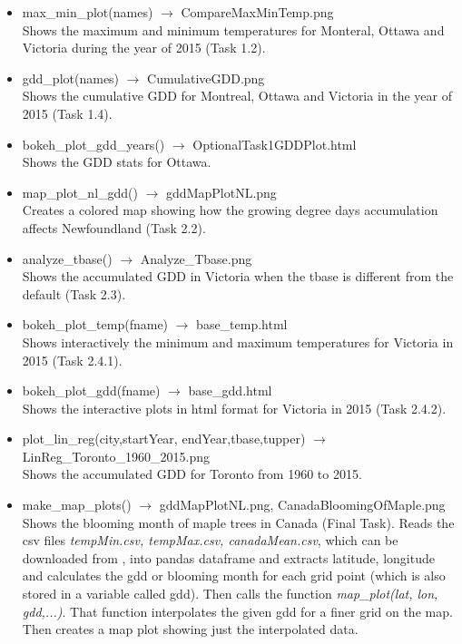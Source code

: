 \documentclass[12pt]{article}
\begin{document}
\begin{description}
\begin{itemize}
\item max\_min\_plot(names) $\to$ CompareMaxMinTemp.png \\
Shows the maximum and minimum temperatures for Monteral, Ottawa and Victoria during the year of 2015 (Task 1.2).

\item gdd\_plot(names)  $\to$ CumulativeGDD.png \\
Shows the cumulative GDD for Montreal, Ottawa and Victoria in the year of 2015 (Task 1.4).

\item bokeh\_plot\_gdd\_years() $\to$ OptionalTask1GDDPlot.html \\
Shows the GDD stats for Ottawa. 

\item map\_plot\_nl\_gdd()  $\to$  gddMapPlotNL.png \\
Creates a colored map showing how the growing degree days accumulation affects Newfoundland (Task 2.2).

\item analyze\_tbase()  $\to$ Analyze\_Tbase.png \\
Shows the accumulated GDD in Victoria when the tbase is different from the default (Task 2.3).

\item bokeh\_plot\_temp(fname) $\to$ base\_temp.html \\
Shows interactively the minimum and maximum temperatures for Victoria in 2015 (Task 2.4.1).

\item bokeh\_plot\_gdd(fname) $\to$ base\_gdd.html \\
Shows the interactive plots in html format for Victoria in 2015 (Task 2.4.2).

\item plot\_lin\_reg(city,startYear, endYear,tbase,tupper) $\to$ LinReg\_Toronto\_1960\_2015.png \\
Shows the accumulated GDD for Toronto from 1960 to 2015.

\item make\_map\_plots() $\to$ gddMapPlotNL.png, CanadaBloomingOfMaple.png \\
Shows the blooming month of maple trees in Canada (Final Task).
Reads the csv files \emph{tempMin.csv, tempMax.csv, canadaMean.csv}, which can 
be downloaded from \cite{gridTemp}, into pandas dataframe and extracts latitude, 
longitude and calculates the gdd or blooming month for each grid point 
(which is also stored in a variable called gdd).
Then calls the function \emph{map\_plot(lat, lon, gdd,...)}. That function
interpolates the given gdd for a finer grid on the map. Then creates a map plot
showing just the interpolated data.
\end{itemize} 


\end{description}
\end{document}
